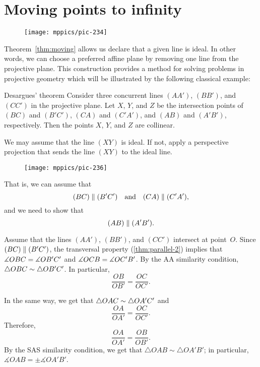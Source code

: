 \section{Moving points to infinity}

{

\begin{wrapfigure}{r}{37mm}
\vskip-8mm
\centering
\texttt{[image: mppics/pic-234]}
\end{wrapfigure}

Theorem~\ref{thm:moving} allows us declare that a given line is ideal.
In other words, we can choose a preferred affine plane by removing one line from the projective plane.
This construction provides a method for solving problems in projective geometry 
which will be illustrated by the following classical example:


\begin{thm}{Desargues' theorem}\label{thm:desargues}
Consider three concurrent lines $(AA')$, $(BB')$, and $(CC')$ in the projective plane.
Let $X$, $Y$, and $Z$ be the intersection points of $(BC)$ and $(B'C')$, $(CA)$ and $(C'A')$,
and $(AB)$ and $(A'B')$, respectively.
Then the points $X$, $Y$, and $Z$ are collinear.
\end{thm}

}

We may assume that the line $(XY)$ is ideal.
If not, apply a perspective projection that sends the line $(XY)$ to the ideal line.

\begin{wrapfigure}{o}{40mm}
\vskip-0mm
\centering
\texttt{[image: mppics/pic-236]}
\end{wrapfigure}

That is, we can assume that 
\[(BC)\parallel (B'C')\quad\text{and}\quad(CA)\parallel (C'A'),\]
and we need to show that 
\[(AB)\parallel(A'B').\]

Assume that the lines $(AA')$, $(BB')$, and $(CC')$ intersect at point~$O$.
Since $(BC)\parallel (B'C')$, 
the transversal property (\ref{thm:parallel-2}) implies that $\measuredangle OBC= \measuredangle OB'C'$ and $\measuredangle OCB= \measuredangle OC'B'$.
By the AA similarity condition, $\triangle OBC\sim\triangle OB'C'$.
In particular,
\[\frac{OB}{OB'}=\frac{OC}{OC'}.\]

In the same way, we get that $\triangle OAC\sim\triangle OA'C'$ and
\[\frac{OA}{OA'}=\frac{OC}{OC'}.\]
Therefore, 
\[\frac{OA}{OA'}=\frac{OB}{OB'}.\]
By the SAS similarity condition, 
we get that $\triangle OAB\sim\triangle OA'B'$;
in particular, $\measuredangle OAB=\pm\measuredangle OA'B'$.

